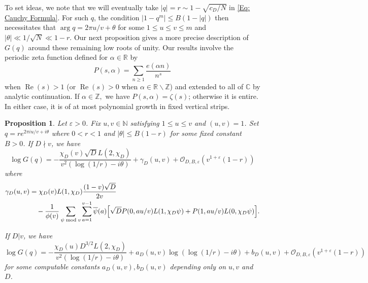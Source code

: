 \documentclass[11pt]{amsart}
\numberwithin{equation}{section}
\newcommand{\mb}{\mathbb}
\newtheorem{prop}[thm]{Proposition}
\theoremstyle{remark}
\begin{document}
To set ideas, we note that we will eventually take $|q|=r\sim1-\sqrt{c_D/N}$ in \eqref{Eq: Cauchy Formula}. For such $q$, the condition $|1-q^m|\leq B(1-|q|)$ then necessitates that $\arg q=2\pi u/v+\theta$ for some $1 \leq u \leq v\leq m$ and $|\theta|\ll 1/\sqrt{N}\ll 1-r$. 
Our next proposition gives a more precise description of $G(q)$ around these remaining low roots of unity. 
Our results involve the periodic zeta function defined for $\alpha\in\mb{R}$ by
\[
P(s,\alpha)=\sum_{n\geq 1}\frac{e(\alpha n)}{n^s}
\]
when $\operatorname{Re}(s)>1$ (or $\operatorname{Re}(s)>0$ when $\alpha\in\mb{R}\backslash\mb{Z}$) and extended to all of $\mb{C}$ by analytic continuation. If $\alpha\in\mb{Z},$ we have $P(s,\alpha)=\zeta(s)$; otherwise it is entire. In either case, it is of at most polynomial growth in fixed vertical strips. 
\begin{prop}\label{precise lem}
Let $\varepsilon>0$. Fix $u,v \in \mathbb{N}$ satisfying $1 \leq u \leq v$ and $(u,v)=1$. Set $q=re^{2\pi i {u}/{v} +i\theta}$ where $0<r<1$ and $|\theta|\leq B(1-r)$ for some fixed constant $B>0$. If $D\nmid v$, we have 
\begin{equation}\label{log F 2}
\log G(q)
=
-\frac{\chi_D(v)\sqrt{D}L(2,\chi_D)}{v^2(\log(1/r)-i\theta)}
+\gamma_D(u,v)
+\mathcal{O}_{D,B,\varepsilon}(v^{1+\varepsilon}(1-r))
\end{equation}
where 
\begin{align}\label{Eq: Gamma Def}
\gamma_D(u,v)
&=
\chi_D(v) L(1,\chi_D) \frac{(1-v)\sqrt{D}}{2v}
\notag \\
&\quad -
\frac{1}{\phi(v)}\sum_{\psi \bmod v} \sum_{a=1}^{v-1}\overline{\psi}(a)\Big[\sqrt{D}P(0,au/v)L(1,\chi_D\psi)
+
P(1,au/v)L(0,\chi_D\psi)\Big].
\end{align}

If $D|v$, we have 
\begin{equation}\label{log F 3}
\log G(q)
=
-\frac{\chi_D(u)D^{3/2}L(2,\chi_D)}{v^2(\log(1/r)-i\theta)}
+a_D(u,v)\log(\log(1/r)-i\theta)+b_D(u,v)+\mathcal{O}_{D,B,\varepsilon}(v^{1+\varepsilon}(1-r))
\end{equation}
for some computable constants $a_D(u,v),b_D(u,v)$ depending only on $u,v$ and $D$. 
\end{prop}
\end{document}
